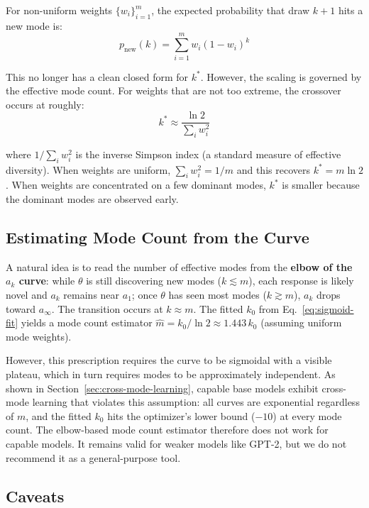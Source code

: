 For non-uniform weights $\{w_i\}_{i=1}^m$, the expected probability that draw $k+1$ hits a new mode is:
\begin{equation}
    p_{\mathrm{new}}(k) = \sum_{i=1}^{m} w_i \left(1 - w_i\right)^{k}
\end{equation}

This no longer has a clean closed form for $k^*$.
However, the scaling is governed by the effective mode count.
For weights that are not too extreme, the crossover occurs at roughly:
\begin{equation}\label{eq:kstar-nonuniform}
    k^* \approx \frac{\ln 2}{\sum_i w_i^2}
\end{equation}

where $1/\sum_i w_i^2$ is the inverse Simpson index (a standard measure of effective diversity).
When weights are uniform, $\sum_i w_i^2 = 1/m$ and this recovers $k^* = m \ln 2$.
When weights are concentrated on a few dominant modes, $k^*$ is smaller because the dominant modes are observed early.

\subsection{Estimating Mode Count from the Curve}\label{sec:mode-count-from-curve}

A natural idea is to read the number of effective modes from the \textbf{elbow of the $a_k$ curve}: while $\theta$ is still discovering new modes ($k \lesssim m$), each response is likely novel and $a_k$ remains near $a_1$; once $\theta$ has seen most modes ($k \gtrsim m$), $a_k$ drops toward $a_\infty$.
The transition occurs at $k \approx m$.
The fitted $k_0$ from Eq.~\ref{eq:sigmoid-fit} yields a mode count estimator $\hat{m} = k_0 / \ln 2 \approx 1.443\, k_0$ (assuming uniform mode weights).

However, this prescription requires the curve to be sigmoidal with a visible plateau, which in turn requires modes to be approximately independent.
As shown in Section~\ref{sec:cross-mode-learning}, capable base models exhibit cross-mode learning that violates this assumption: all curves are exponential regardless of $m$, and the fitted $k_0$ hits the optimizer's lower bound ($-10$) at every mode count.
The elbow-based mode count estimator therefore does not work for capable models.
It remains valid for weaker models like GPT-2, but we do not recommend it as a general-purpose tool.

\subsection{Caveats}

